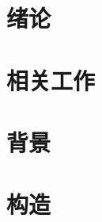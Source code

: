 \documentclass[a4paper,12pt,oneside,openany]{ctexbook}
\begin{document}

\tableofcontents

%
\chapter{绪论}
\chapter{相关工作}
\chapter{背景}
\chapter{构造}
\end{document}
